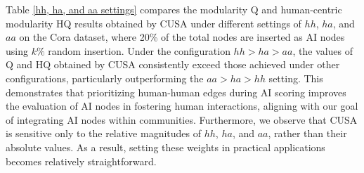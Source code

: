 Table \ref{hh, ha, and aa settings} compares the modularity Q and human-centric modularity HQ results obtained by CUSA under different settings of $hh$, $ha$, and $aa$ on the Cora dataset, where 20\% of the total nodes are inserted as AI nodes using $k\%$ random insertion. Under the configuration $hh > ha > aa$, the values of Q and HQ obtained by CUSA consistently exceed those achieved under other configurations, particularly outperforming the $aa > ha > hh$ setting. This demonstrates that prioritizing human-human edges during AI scoring improves the evaluation of AI nodes in fostering human interactions, aligning with our goal of integrating AI nodes within communities. Furthermore, we observe that CUSA is sensitive only to the relative magnitudes of $hh$, $ha$, and $aa$, rather than their absolute values. As a result, setting these weights in practical applications becomes relatively straightforward.


\begingroup
\renewcommand{\arraystretch}{1.08}
\begin{table}[t]
\centering
\caption{The Q and HQ results on the Cora dataset obtained by CUSA under different inserted ratios of AI nodes.}
\label{different ai ratio}
\end{table}
\endgroup

\begingroup
\renewcommand{\arraystretch}{1.2}
\begin{table}[t]
\centering
\caption{The execution time (minutes) on two large-scale datasets \cite{yang2012defining} to assess the scalability of CUSA.}
\label{Scalability of CUSA}
\end{table}
\endgroup


